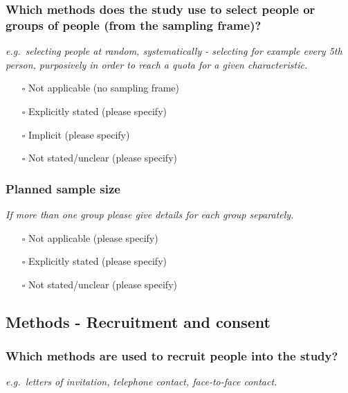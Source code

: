 \documentclass[
  doc, a4paper]{apa7}
\providecommand{\tightlist}{%
  \setlength{\itemsep}{0pt}\setlength{\parskip}{0pt}}
\begin{document}
\subsubsection{Which methods does the study use to select people or groups of people (from the sampling frame)?}\label{which-methods-does-the-study-use-to-select-people-or-groups-of-people-from-the-sampling-frame}

\emph{e.g.~selecting people at random, systematically - selecting for example every 5th person, purposively in order to reach a quota for a given characteristic.}

\begin{itemize}
\tightlist
\item[$\square$]
  Not applicable (no sampling frame)
\item[$\square$]
  Explicitly stated (please specify)
\item[$\square$]
  Implicit (please specify)
\item[$\square$]
  Not stated/unclear (please specify)
\end{itemize}

\subsubsection{Planned sample size}\label{planned-sample-size}

\emph{If more than one group please give details for each group separately.}

\begin{itemize}
\tightlist
\item[$\square$]
  Not applicable (please specify)
\item[$\square$]
  Explicitly stated (please specify)
\item[$\square$]
  Not stated/unclear (please specify)
\end{itemize}

\subsection{Methods - Recruitment and consent}\label{methods---recruitment-and-consent}

\subsubsection{Which methods are used to recruit people into the study?}\label{which-methods-are-used-to-recruit-people-into-the-study}

\emph{e.g.~letters of invitation, telephone contact, face-to-face contact.}
\end{document}
